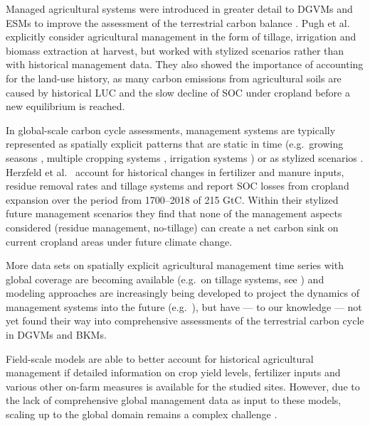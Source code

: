 \documentclass[gc, manuscript]{copernicus}
\begin{document}
Managed agricultural systems were introduced in greater detail to DGVMs and ESMs to improve the assessment of the terrestrial carbon balance \citep[e.g.~][]{bondeau_modelling_2007, lindeskog_implications_2013}. Pugh et al.~\citeyearpar{pugh_simulated_2015} explicitly consider agricultural management in the form of tillage, irrigation and biomass extraction at harvest, but worked with stylized scenarios rather than with historical management data. They also showed the importance of accounting for the land-use history, as many carbon emissions from agricultural soils are caused by historical LUC and the slow decline of SOC under cropland before a new equilibrium is reached.

In global-scale carbon cycle assessments, management systems are typically represented as spatially explicit patterns that are static in time (e.g.~growing seasons \citep{portmann_mirca2000global_2010}, multiple cropping systems \citep{waha_multiple_2020}, irrigation systems \citep{jagermeyr_water_2015}) or as stylized scenarios \citep[e.g.~][]{pugh_simulated_2015, lutz_simulating_2019}. Herzfeld et al.~\citeyearpar{herzfeld_soc_2021} account for historical changes in fertilizer and manure inputs, residue removal rates and tillage systems and report SOC losses from cropland expansion over the period from 1700--2018 of 215 GtC. Within their stylized future management scenarios they find that none of the management aspects considered (residue management, no-tillage) can create a net carbon sink on current cropland areas under future climate change.

More data sets on spatially explicit agricultural management time series with global coverage are becoming available (e.g.~on tillage systems, see \citep{porwollik_generating_2019, prestele_spatially_2018}) and modeling approaches are increasingly being developed to project the dynamics of management systems into the future (e.g.~\citep{iizumi_modeling_2019, minoli_modelling_2019}), but have --- to our knowledge --- not yet found their way into comprehensive assessments of the terrestrial carbon cycle in DGVMs and BKMs.

Field-scale models \citep{del_grosso_simulated_2001, coleman_simulating_1997, smith_estimating_2010, taghizadeh-toosi_c-tool_2014} are able to better account for historical agricultural management if detailed information on crop yield levels, fertilizer inputs and various other on-farm measures is available for the studied sites. However, due to the lack of comprehensive global management data as input to these models, scaling up to the global domain remains a complex challenge \citep{morais_detailed_2019}.
\end{document}
